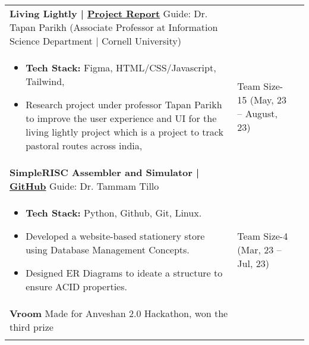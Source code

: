 \documentclass[10pt]{extarticle}
\begin{document}
\begin{contained}
\begin{longtable}{p{}p{}p{}}
\textbf{Living Lightly | \href{https://drive.google.com/file/d/1X0NO67mCJxHu2BKZ6AFn1_c6qAHlykQ-/view?usp=sharing}{Project Report}}\newline
    Guide: Dr. Tapan Parikh (Associate Professor at Information Science Department | Cornell University)\\
    \vspace{-4mm}
    \begin{itemize}
        \item \textbf{Tech Stack:} Figma, HTML/CSS/Javascript, Tailwind, 
        \item Research project under professor Tapan Parikh to improve the user experience and UI for the living lightly project which is a project to track pastoral routes across india,
    \end{itemize}
    \vspace{-4mm}
    &Team Size-15
    \newline (May, 23 – August, 23)\\
    \textbf{SimpleRISC Assembler and Simulator | \href{https://github.com/SakshxmSingh/Assembler-Simulator}{GitHub}}\newline
    Guide: Dr. Tammam Tillo\\
    \vspace{-4mm}
    \begin{itemize}
        \item \textbf{Tech Stack:} Python, Github, Git, Linux.
        \item Developed a website-based stationery store using Database Management Concepts.
        \item Designed ER Diagrams to ideate a structure to ensure ACID properties.
    \end{itemize}
    \vspace{-4mm}
    &Team Size-4
    \newline (Mar, 23 – Jul, 23)\\
    \textbf{Vroom}\newline
    Made for Anveshan 2.0 Hackathon, won the third prize\\
    \vspace{-4mm}

\end{longtable}
\end{contained}
\end{document}
